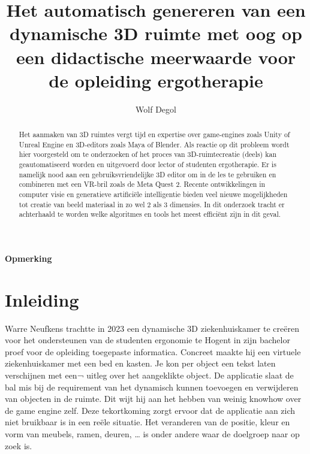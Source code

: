 \documentclass{hogent-article}
\title{Het automatisch genereren  van een dynamische 3D ruimte met oog op een didactische meerwaarde voor de opleiding ergotherapie }
\author{Wolf Degol}
\begin{document}
\begin{abstract}
Het aanmaken van 3D ruimtes vergt tijd en expertise over game-engines zoals Unity of Unreal Engine en 3D-editors zoals Maya of Blender. Als reactie op dit probleem wordt hier voorgesteld om te onderzoeken of het proces van 3D-ruimtecreatie (deels) kan geautomatiseerd worden en uitgevoerd door lector of studenten ergotherapie. Er is namelijk nood aan een gebruiksvriendelijke 3D editor om in de les te gebruiken en combineren met een VR-bril zoals de Meta Quest 2. 
Recente ontwikkelingen in computer visie en generatieve artificiële intelligentie bieden veel nieuwe mogelijkheden tot creatie van beeld materiaal in zo wel 2 als 3 dimensies. In dit onderzoek tracht er achterhaald te worden welke algoritmes en tools het meest efficiënt zijn in dit geval. 

\end{abstract}

\tableofcontents

\bigskip


\paragraph{Opmerking}



\section{Inleiding}%
\label{sec:inleiding}


Warre Neufkens trachtte in 2023 een dynamische 3D ziekenhuiskamer te creëren voor het ondersteunen van de studenten ergonomie te Hogent in zijn bachelor proef voor de opleiding toegepaste informatica. Concreet maakte hij een virtuele ziekenhuiskamer met een bed en kasten. Je kon per object een tekst laten verschijnen met een¬ uitleg over het aangeklikte object. De applicatie slaat de bal mis bij de requirement van het dynamisch kunnen toevoegen en verwijderen van objecten in de ruimte. Dit wijt hij aan het hebben van weinig knowhow over de game engine zelf. Deze tekortkoming zorgt ervoor dat de applicatie aan zich niet bruikbaar is in een reële situatie. Het veranderen van de positie, kleur en vorm van meubels, ramen, deuren, … is onder andere waar de doelgroep naar op zoek is. 
\end{document}
